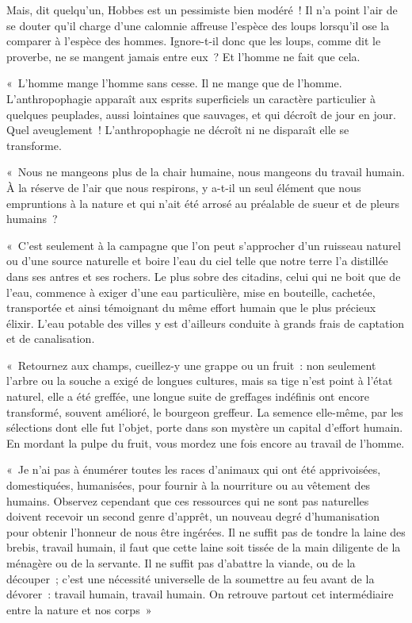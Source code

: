 \documentclass[french,twoside]{book} %
\begin{document}
\noindent Mais, dit quelqu’un, Hobbes est un pessimiste bien modéré ! Il n’a point l’air de se douter qu’il charge d’une calomnie affreuse l’espèce des loups lorsqu’il ose la comparer à l’espèce des hommes. Ignore-t-il donc que les loups, comme dit le proverbe, ne se mangent jamais entre eux ? Et l’homme ne fait que cela.\par
« L’homme mange l’homme sans cesse. Il ne mange que de l’homme. L’anthropophagie apparaît aux esprits superficiels un caractère particulier à quelques peuplades, aussi lointaines que sauvages, et qui décroît de jour en jour. Quel aveuglement ! L’anthropophagie ne décroît ni ne disparaît elle se transforme.\par
« Nous ne mangeons plus de la chair humaine, nous mangeons du travail humain. À la réserve de l’air que nous respirons, y a-t-il un seul élément que nous empruntions à la nature et qui n’ait été arrosé au préalable de sueur et de pleurs humains ?\par
« C’est seulement à la campagne que l’on peut s’approcher d’un ruisseau naturel ou d’une source naturelle et boire l’eau du ciel telle que notre terre l’a distillée dans ses antres et ses rochers. Le plus sobre des citadins, celui qui ne boit que de l’eau, commence à exiger d’une eau particulière, mise en bouteille, cachetée, transportée et ainsi témoignant du même effort humain que le plus précieux élixir. L’eau potable des villes y est d’ailleurs conduite à grands frais de captation et de canalisation.\par
« Retournez aux champs, cueillez-y une grappe ou un fruit : non seulement l’arbre ou la souche a exigé de longues cultures, mais sa tige n’est point à l’état naturel, elle a été greffée, une longue suite de greffages indéfinis ont encore transformé, souvent amélioré, le bourgeon greffeur. La semence elle-même, par les sélections dont elle fut l’objet, porte dans son mystère un capital d’effort humain. En mordant la pulpe du fruit, vous mordez une fois encore au travail de l’homme.\par
« Je n’ai pas à énumérer toutes les races d’animaux qui ont été apprivoisées, domestiquées, humanisées, pour fournir à la nourriture ou au vêtement des humains. Observez cependant que ces ressources qui ne sont pas naturelles doivent recevoir un second genre d’apprêt, un nouveau degré d’humanisation pour obtenir l’honneur de nous être ingérées. Il ne suffit pas de tondre la laine des brebis, travail humain, il faut que cette laine soit tissée de la main diligente de la ménagère ou de la servante. Il ne suffit pas d’abattre la viande, ou de la découper ; c’est une nécessité universelle de la soumettre au feu avant de la dévorer : travail humain, travail humain. On retrouve partout cet intermédiaire entre la nature et nos corps »\par
\end{document}
